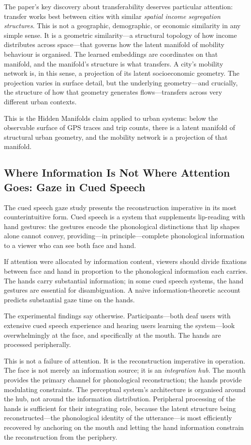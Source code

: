 \documentclass[12pt, letterpaper]{article}
\theoremstyle{remark}
\begin{document}
The paper's key discovery about transferability deserves particular attention:
transfer works best between cities with similar \emph{spatial income
segregation structures}.  This is not a geographic, demographic, or economic
similarity in any simple sense.  It is a geometric similarity---a structural
topology of how income distributes across space---that governs how the latent
manifold of mobility behaviour is organised.  The learned embeddings are
coordinates on that manifold, and the manifold's structure is what transfers.
A city's mobility network is, in this sense, a projection of its latent
socioeconomic geometry.  The projection varies in surface detail, but the
underlying geometry---and crucially, the structure of how that geometry
generates flows---transfers across very different urban contexts.

This is the Hidden Manifolds claim applied to urban systems: below the
observable surface of GPS traces and trip counts, there is a latent manifold
of structural urban geometry, and the mobility network is a projection of
that manifold.

\subsection{Where Information Is Not Where Attention Goes: Gaze in Cued Speech}

The cued speech gaze study presents the reconstruction imperative in its
most counterintuitive form.  Cued speech is a system that supplements
lip-reading with hand gestures: the gestures encode the phonological
distinctions that lip shapes alone cannot convey, providing---in
principle---complete phonological information to a viewer who can see both
face and hand.

If attention were allocated by information content, viewers should divide
fixations between face and hand in proportion to the phonological information
each carries.  The hands carry substantial information; in some cued speech
systems, the hand gestures are essential for disambiguation.  A naive
information-theoretic account predicts substantial gaze time on the hands.

The experimental findings say otherwise.  Participants---both deaf users
with extensive cued speech experience and hearing users learning the
system---look overwhelmingly at the face, and specifically at the mouth.
The hands are processed peripherally.

This is not a failure of attention.  It is the reconstruction imperative
in operation.  The face is not merely an information source; it is an
\emph{integration hub}.  The mouth provides the primary channel for
phonological reconstruction; the hands provide modulating constraints.
The perceptual system's architecture is organised around the hub, not around
the information distribution.  Peripheral processing of the hands is
sufficient for their integrating role, because the latent structure being
reconstructed---the phonological identity of the utterance---is most
efficiently recovered by anchoring on the mouth and letting the hand
information constrain the reconstruction from the periphery.
\end{document}
